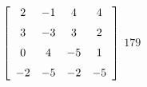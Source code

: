 {$\left[ \begin {array}{cccc} 2&-1&4&4\\\noalign{\medskip}3&-3&3&2
\\\noalign{\medskip}0&4&-5&1\\\noalign{\medskip}-2&-5&-2&-5\end {array} \right]$} 
{$179$}

  

 

